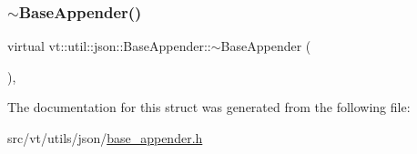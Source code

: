 \subsubsection{\texorpdfstring{$\sim$\+Base\+Appender()}{~BaseAppender()}}
{\footnotesize\ttfamily virtual vt\+::util\+::json\+::\+Base\+Appender\+::$\sim$\+Base\+Appender (\begin{DoxyParamCaption}{ }\end{DoxyParamCaption})\hspace{0.3cm}{\ttfamily [virtual]}, {\ttfamily [default]}}



The documentation for this struct was generated from the following file\+:\begin{DoxyCompactItemize}
\item 
src/vt/utils/json/\hyperlink{base__appender_8h}{base\+\_\+appender.\+h}\end{DoxyCompactItemize}
